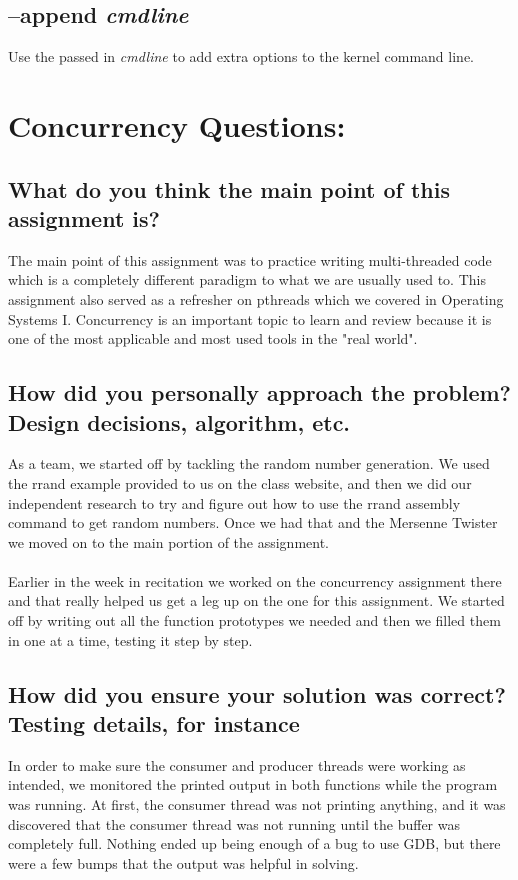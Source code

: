 \documentclass{article}
\begin{document}
\subsection*{--append \textit{cmdline}}
Use the passed in \textit{cmdline} to add extra options to the kernel command line.

\section*{Concurrency Questions:}
\subsection*{What do you think the main point of this assignment is?}
The main point of this assignment was to practice writing multi-threaded code which is 
a completely different paradigm to what we are usually used to. This assignment also served as
a refresher on pthreads which we covered in Operating Systems I. Concurrency is an important
topic to learn and review because it is one of the most applicable and most used tools in the
"real world".
\subsection*{How did you personally approach the problem? Design decisions, algorithm, etc.}
As a team, we started off by tackling the random number generation. We used the rrand example
provided to us on the class website, and then we did our independent research to try and 
figure out how to use the rrand assembly command to get random numbers. Once we had that and
the Mersenne Twister we moved on to the main portion of the assignment.
\\\\
Earlier in the week in recitation we worked on the concurrency assignment there and that really
helped us get a leg up on the one for this assignment. We started off by writing out all the
function prototypes we needed and then we filled them in one at a time, testing it step by step.
\subsection*{How did you ensure your solution was correct? Testing details, for instance}
In order to make sure the consumer and producer threads were working as intended, we monitored the printed output in both functions while the program was running. At first, the consumer thread was not printing anything, and it was discovered that the consumer thread was not running until the buffer was completely full. Nothing ended up being enough of a bug to use GDB, but there were a few bumps that the output was helpful in solving.
\end{document}
